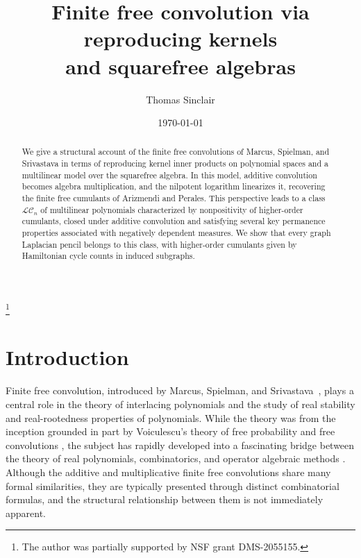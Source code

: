\documentclass[11pt]{amsart}
\theoremstyle{definition}
\begin{document}
\title[Finite free convolution via reproducing kernels]{Finite free convolution via reproducing kernels \\
and squarefree algebras}

\author[T.~Sinclair]{Thomas Sinclair}
\address{Department of Mathematics, Purdue University\\ 150 N.\ University St.\\ West Lafayette, IN 47907}
\thanks{The author was partially supported by NSF grant DMS-2055155.}

\date{\today}


\begin{abstract}
    We give a structural account of the finite free convolutions of Marcus, Spielman, and Srivastava in terms of reproducing kernel inner products on polynomial spaces and a multilinear model over the squarefree algebra. In this model, additive convolution becomes algebra multiplication, and the nilpotent logarithm linearizes it, recovering the finite free cumulants of Arizmendi and Perales. This perspective leads to a class $\mathcal{LC}_n$ of multilinear polynomials characterized by nonpositivity of higher-order cumulants, closed under additive convolution and satisfying several key permanence properties associated with negatively dependent measures. We show that every graph Laplacian pencil belongs to this class, with higher-order cumulants given by Hamiltonian cycle counts in induced subgraphs.
\end{abstract}

\maketitle

\section{Introduction}\label{sec:intro}

Finite free convolution, introduced by Marcus, Spielman, and
Srivastava~\cite{MSS15,MSS22}, plays a central role in the theory
of interlacing polynomials and the study of real stability and real-rootedness properties of polynomials. While the theory was from the inception grounded in part by Voiculescu's theory of free probability and free convolutions \cite{Voi86, Voi92}, the subject has rapidly developed into a fascinating bridge between the theory of real polynomials, combinatorics, and operator algebraic methods \cite{AFPU, AP18}. Although the additive and multiplicative finite free convolutions share many formal similarities, they are typically presented through distinct combinatorial formulas, and the structural relationship between them is not immediately apparent.
\end{document}
